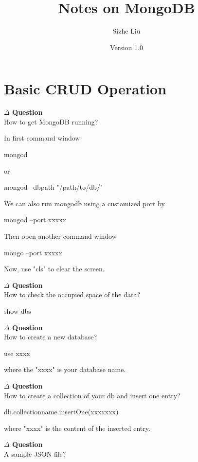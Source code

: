 \documentclass[12pt]{article}
\title{Notes on MongoDB}
\author{Sizhe Liu}
\date{Version 1.0}
\newenvironment{que}
    { \begin{mdframed}[backgroundcolor=green!20] \textbf{$\Delta$ Question} \\}
    {  \end{mdframed}}
\begin{document}
\begin{titlingpage}
\maketitle
\end{titlingpage}
\newpage
\tableofcontents
\newpage
\section{Basic CRUD Operation}
\begin{que}
How to get MongoDB running?
\end{que}
\noindent
In first command window
\begin{code}
mongod
\end{code}
or
\begin{code}
mongod --dbpath "/path/to/db/"
\end{code}
We can also run mongodb using a customized port by
\begin{code}
mongod --port xxxxx
\end{code}
Then open another command window
\begin{code}
mongo --port xxxxx
\end{code}
Now, use "cls" to clear the screen.
\begin{que}
How to check the occupied space of the data?
\end{que}
\begin{code}
show dbs
\end{code}
\begin{que}
How to create a new database?
\end{que}
\begin{code}
use xxxx
\end{code}
where the "xxxx" is your database name.
\begin{que}
How to create a collection of your db and insert one entry?
\end{que}
\begin{code}
db.collectionname.insertOne({xxxxxxx})
\end{code}
where "xxxx" is the content of the inserted entry.
\begin{que}
A sample JSON file?
\end{que}
\begin{code}
\end{code}
\end{document}
